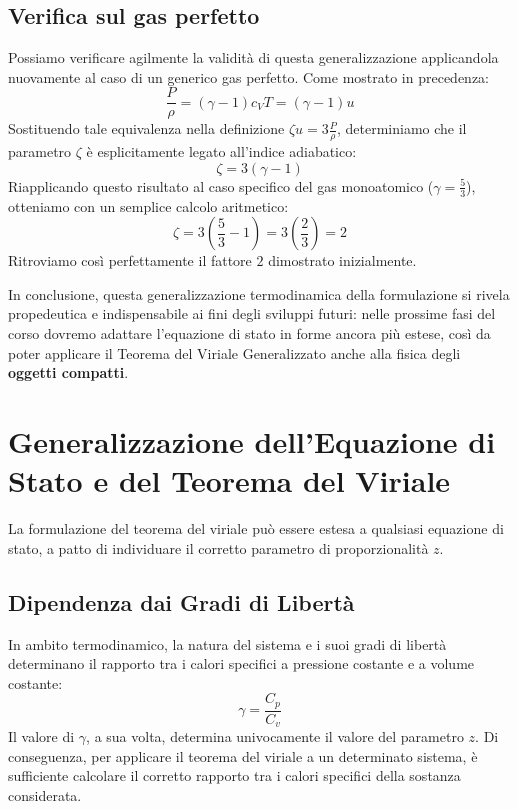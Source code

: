 \subsection{Verifica sul gas perfetto}
Possiamo verificare agilmente la validità di questa generalizzazione applicandola nuovamente al caso di un generico gas perfetto. Come mostrato in precedenza:
\begin{equation}
\frac{P}{\rho} = (\gamma - 1) c_V T = (\gamma - 1) u
\end{equation}
Sostituendo tale equivalenza nella definizione $\zeta u = 3 \frac{P}{\rho}$, determiniamo che il parametro $\zeta$ è esplicitamente legato all'indice adiabatico:
\begin{equation}
\zeta = 3(\gamma - 1)
\end{equation}
Riapplicando questo risultato al caso specifico del gas monoatomico ($\gamma = \frac{5}{3}$), otteniamo con un semplice calcolo aritmetico:
\begin{equation}
\zeta = 3 \left( \frac{5}{3} - 1 \right) = 3 \left( \frac{2}{3} \right) = 2
\end{equation}
Ritroviamo così perfettamente il fattore $2$ dimostrato inizialmente.

In conclusione, questa generalizzazione termodinamica della formulazione si rivela propedeutica e indispensabile ai fini degli sviluppi futuri: nelle prossime fasi del corso dovremo adattare l'equazione di stato in forme ancora più estese, così da poter applicare il Teorema del Viriale Generalizzato anche alla fisica degli \textbf{oggetti compatti}.

\section{Generalizzazione dell'Equazione di Stato e del Teorema del Viriale}

La formulazione del teorema del viriale può essere estesa a qualsiasi equazione di stato, a patto di individuare il corretto parametro di proporzionalità $z$.

\subsection{Dipendenza dai Gradi di Libertà}
In ambito termodinamico, la natura del sistema e i suoi gradi di libertà determinano il rapporto tra i calori specifici a pressione costante e a volume costante:
\begin{equation}
\gamma = \frac{C_p}{C_v}
\end{equation}
Il valore di $\gamma$, a sua volta, determina univocamente il valore del parametro $z$. Di conseguenza, per applicare il teorema del viriale a un determinato sistema, è sufficiente calcolare il corretto rapporto tra i calori specifici della sostanza considerata.

